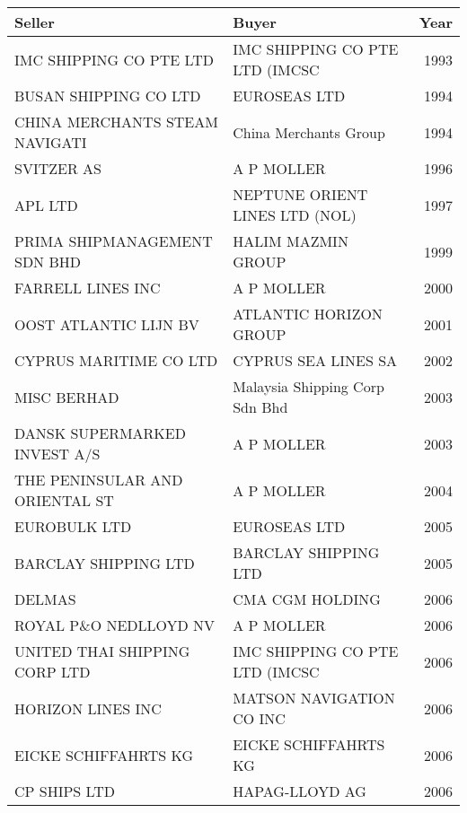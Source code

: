 
\begin{tabular}[t]{llr}
\toprule
Seller & Buyer & Year\\
\midrule
IMC SHIPPING CO PTE LTD & IMC SHIPPING CO PTE LTD (IMCSC & 1993\\
BUSAN SHIPPING CO LTD & EUROSEAS LTD & 1994\\
CHINA MERCHANTS STEAM NAVIGATI & China Merchants Group & 1994\\
SVITZER AS & A P MOLLER & 1996\\
APL LTD & NEPTUNE ORIENT LINES LTD (NOL) & 1997\\
PRIMA SHIPMANAGEMENT SDN BHD & HALIM MAZMIN GROUP & 1999\\
FARRELL LINES INC & A P MOLLER & 2000\\
OOST ATLANTIC LIJN BV & ATLANTIC HORIZON GROUP & 2001\\
CYPRUS MARITIME CO LTD & CYPRUS SEA LINES SA & 2002\\
MISC BERHAD & Malaysia Shipping Corp Sdn Bhd & 2003\\
DANSK SUPERMARKED INVEST A/S & A P MOLLER & 2003\\
THE PENINSULAR AND ORIENTAL ST & A P MOLLER & 2004\\
EUROBULK LTD & EUROSEAS LTD & 2005\\
BARCLAY SHIPPING LTD & BARCLAY SHIPPING LTD & 2005\\
DELMAS & CMA CGM HOLDING & 2006\\
ROYAL P\&O NEDLLOYD NV & A P MOLLER & 2006\\
UNITED THAI SHIPPING CORP LTD & IMC SHIPPING CO PTE LTD (IMCSC & 2006\\
HORIZON LINES INC & MATSON NAVIGATION CO INC & 2006\\
EICKE SCHIFFAHRTS KG & EICKE SCHIFFAHRTS KG & 2006\\
CP SHIPS LTD & HAPAG-LLOYD AG & 2006\\
\bottomrule
\end{tabular}
